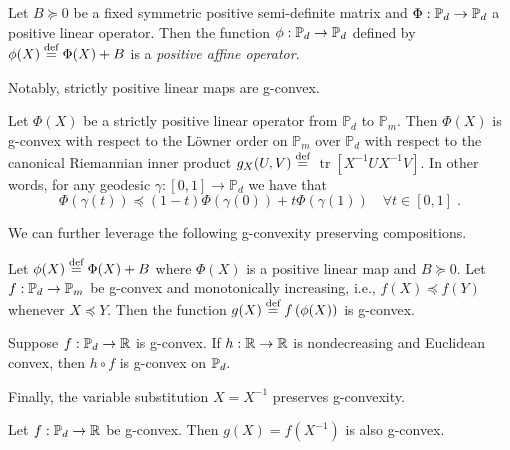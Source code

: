 \documentclass[sn-nature]{sn-jnl}%
\theoremstyle{thmstyleone}%
\theoremstyle{thmstyletwo}%
\theoremstyle{thmstylethree}%
\begin{document}
\begin{definition}
    Let $B \succeq 0$ be a fixed symmetric positive semi-definite matrix and $\Phi: \mathbb{P}_d \to \mathbb{P}_d$ a positive linear operator. Then the function $\phi:\mathbb{P}_d \to \mathbb{P}_d$ defined by $\phi(X) \stackrel{\text{def}}{=} \Phi(X) + B $ is a \textit{positive affine operator}.
\end{definition}
%
Notably, strictly positive linear maps are g-convex.
%
\begin{prop}\label{prop:strict_positive_linear}
    Let $\Phi(X)$ be a strictly positive linear operator from $\mathbb{P}_d$ to $\mathbb{P}_m$. Then $\Phi(X)$ is g-convex with respect to the Löwner order on $\mathbb{P}_m$ over $\mathbb{P}_d$ with respect to the canonical Riemannian inner product $g_X(U, V)\stackrel{\text{def}}{=}$ $\operatorname{tr}\left[X^{-1} U X^{-1} V\right]$. In other words, for any geodesic $\gamma:[0,1] \rightarrow \mathbb{P}_d$ we have that
$$
\Phi(\gamma(t)) \preceq(1-t) \Phi(\gamma(0))+t \Phi(\gamma(1)) \quad \forall t \in[0,1] \; .
$$
\end{prop}
%
We can further leverage the following g-convexity preserving compositions. 
%
\begin{prop}\label{prop:gcvx_affine_positive}

    Let  $\phi(X) \stackrel{\text{def}}{=} \Phi(X) + B$ where $\Phi(X)$ is a positive linear map and $B \succeq 0$. 
        Let $f: \mathbb{P}_d \to \mathbb{P}_m$ be g-convex and monotonically increasing, i.e., $f(X) \preceq f(Y)$ whenever $X \preceq Y$. Then the function
        $g(X) \stackrel{\text{def}}{=} f\left( \phi(X)\right)$
        is g-convex.
\end{prop}

\begin{prop}\label{prop:cvx_gcvx_composition}
    Suppose $f: \mathbb{P}_d \to \mathbb{R}$ is g-convex. If $h: \mathbb{R} \to \mathbb{R}$ is nondecreasing and Euclidean convex, then $h \circ f$ is g-convex on $\mathbb{P}_d.$
\end{prop}


Finally, the variable substitution $X = X^{-1}$ preserves g-convexity. 


\begin{prop}\label{lemma:inverse_gcvx}
Let $f: \mathbb{P}_d \to \mathbb{R}$ be g-convex.
Then $g(X) = f(X^{-1})$ is also g-convex.


\end{prop}
\end{document}

